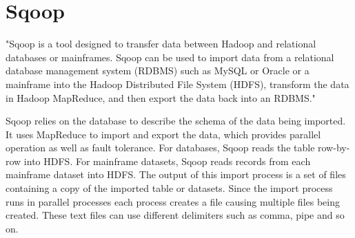\section{Sqoop}

"Sqoop is a tool designed to transfer data between Hadoop and 
relational databases or mainframes. Sqoop can be used to import 
data from a relational database management system (RDBMS) such 
as MySQL or Oracle or a mainframe into the Hadoop Distributed 
File System (HDFS), transform the data in Hadoop MapReduce, and 
then export the data back into an RDBMS." \cite{hid-sp18-517-Sqoop}

Sqoop relies on the database to describe the schema of the data 
being imported. It uses MapReduce to import and export the data, 
which provides parallel operation as well as fault tolerance. 
For databases, Sqoop reads the table row-by-row into HDFS. 
For mainframe datasets, Sqoop reads records from each mainframe 
dataset into HDFS. The output of this import process is a set of 
files containing a copy of the imported table or datasets. Since 
the import process runs in parallel processes each process 
creates a file causing multiple files being created. These text 
files can use different delimiters such as comma, pipe and so on. 
\cite{hid-sp18-517-Sqoop}


